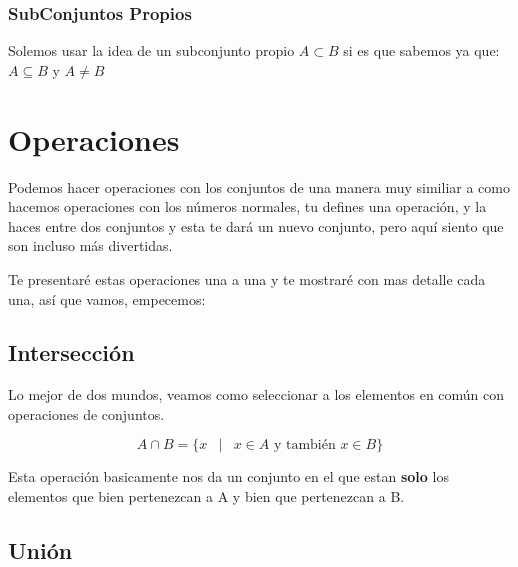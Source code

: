 \documentclass[12pt]{report}                                    %
\DeclareMathOperator \Space {\quad}                             %
\DeclareMathOperator \MiniSpace {\;}                            %
\newcommand \Such {\MiniSpace|\MiniSpace}                       %
\begin{document}
            \subsubsection{SubConjuntos Propios}

            Solemos usar la idea de un subconjunto propio $A \subset B$ si es que sabemos ya que:
            $A \subseteq B$ y $A \neq B$





    \clearpage
    \section{Operaciones}

        Podemos hacer operaciones con los conjuntos de una manera muy similiar a como hacemos
        operaciones con los números normales, tu defines una operación, y la haces entre dos conjuntos
        y esta te dará un nuevo conjunto,  pero aquí siento que son incluso más divertidas.

        Te presentaré estas operaciones una a una y te mostraré con mas detalle cada una, así 
        que vamos, empecemos:

        \subsection{Intersección}

            Lo mejor de dos mundos, veamos como seleccionar a los elementos en común con operaciones
            de conjuntos.

            \begin{equation}
                A \cap B = \{ x \Such x \in A \text{ y también } x \in B \}
            \end{equation}

            Esta operación basicamente nos da un conjunto en el que estan \textbf{solo} los elementos
            que bien pertenezcan a A y bien que pertenezcan a B.


        \clearpage
        \subsection{Unión}
\end{document}
